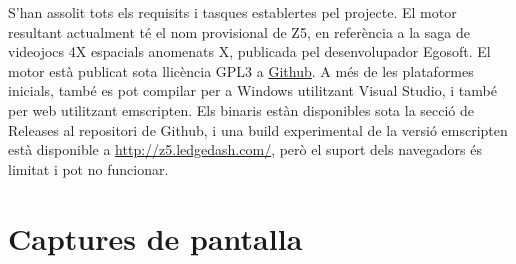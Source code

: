 S'han assolit tots els requisits i tasques establertes pel projecte. El motor resultant actualment té el nom provisional de Z5, en referència a la saga de videojocs 4X espacials anomenats X, publicada pel desenvolupador Egosoft.
El motor està publicat sota llicència GPL3 a \href{https://github.com/theKlanc/Z5}{Github}. A més de les plataformes inicials, també es pot compilar per a Windows utilitzant Visual Studio, i també per web utilitzant emscripten.
Els binaris estàn disponibles sota la secció de Releases al repositori de Github, i una build experimental de la versió emscripten està disponible a \url{http://z5.ledgedash.com/}, però el suport dels navegadors és limitat i pot no funcionar.

\section{Captures de pantalla}


